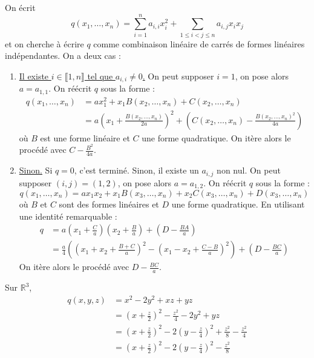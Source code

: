   \begin{theorem}
    On écrit
    \[ q(x_1, \dots, x_n) = \sum_{i=1}^n a_{i,i} x_i^2 + \sum_{1 \leq i<j \leq n} a_{i,j} x_ix_j \]
    et on cherche à écrire $q$ comme combinaison linéaire de carrés de formes linéaires indépendantes. On a deux cas :
    \begin{enumerate}[label={\bfseries(\roman*)}]
      \item \uline{Il existe $i \in \llbracket 1, n \rrbracket$ tel que $a_{i,i} \neq 0$.} On peut supposer $i = 1$, on pose alors $a = a_{1,1}$. On réécrit $q$ sous la forme :
      \begin{align*}
        q(x_1, \dots, x_n) &= ax_1^2 + x_1B(x_2, \dots, x_n) + C(x_2, \dots, x_n) \\
        &= a\left( x_1 + \frac{B(x_2, \dots, x_n)}{2a} \right)^2 + \left( C(x_2, \dots, x_n) - \frac{B(x_2, \dots, x_n)^2}{4a} \right)
      \end{align*}
      où $B$ est une forme linéaire et $C$ une forme quadratique. On itère alors le procédé avec $C - \frac{B^2}{4a}$.
      \item \uline{Sinon.} Si $q = 0$, c'est terminé. Sinon, il existe un $a_{i,j}$ non nul. On peut supposer $(i,j) = (1,2)$, on pose alors $a = a_{1,2}$. On réécrit $q$ sous la forme :
      \[ q(x_1, \dots, x_n) = ax_1x_2 + x_1B(x_3, \dots, x_n) + x_2C(x_3, \dots, x_n) + D(x_3, \dots, x_n) \]
      où $B$ et $C$ sont des formes linéaires et $D$ une forme quadratique. En utilisant une identité remarquable :
      \begin{align*}
        q &= a\left( x_1 + \frac{C}{a} \right) \left( x_2 + \frac{B}{a} \right) + \left( D - \frac{BA}{a} \right) \\
        &= \frac{a}{4} \left( \left( x_1 + x_2 + \frac{B+C}{a} \right)^2 - \left( x_1 - x_2 + \frac{C-B}{a} \right)^2 \right) + \left( D - \frac{BC}{a} \right)
      \end{align*}
      On itère alors le procédé avec $D - \frac{BC}{a}$.
    \end{enumerate}
  \end{theorem}

  \begin{example}
    \label{171-2}
    Sur $\mathbb{R}^3$,
    \begin{align*}
      q(x,y,z) &= x^2 - 2y^2 + xz + yz \\
      &= \left( x + \frac{z}{2} \right)^2 - \frac{z^2}{4} - 2y^2 + yz \\
      &= \left( x + \frac{z}{2} \right)^2 - 2 \left( y - \frac{z}{4} \right)^2 + \frac{z^2}{8} - \frac{z^2}{4} \\
      &= \left( x + \frac{z}{2} \right)^2 - 2 \left( y - \frac{z}{4} \right)^2 - \frac{z^2}{8}
    \end{align*}
  \end{example}

